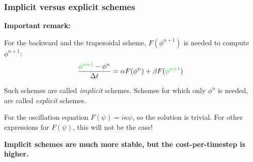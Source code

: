 \documentclass[aspectratio=43,9pt]{beamer}
\begin{document}
%
%
\begin{frame}
	\frametitle{Implicit versus explicit schemes}
	\textbf{Important remark:}
	\par\vspace*{3ex}
	For the backward and the trapezoidal scheme, $F(\phi^{n+1})$ is needed to compute $\phi^{n+1}$:
	\begin{equation*}
		\frac{\textcolor{green!80!black}{\phi^{n+1}}-\phi^n}{\Delta t}=\alpha F(\phi^n)+\beta F(\textcolor{green!80!black}{\phi^{n+1}})
	\end{equation*}
	\par\vspace*{2ex}
	Such schemes are called \emph{implicit} schemes. Schemes for which only $\phi^n$ is needed, are called \emph{explicit} schemes.
	\par\vspace*{4ex}
	For the oscillation equation $F(\psi)=i\kappa\psi$, so the solution is trivial. For other expressions for $F(\psi)$, this will not be the case!
\pause
	\par\vspace*{4ex}
	\textbf{Implicit schemes are much more stable, but the cost-per-timestep is higher.}
\end{frame}
%
%
\end{document}
